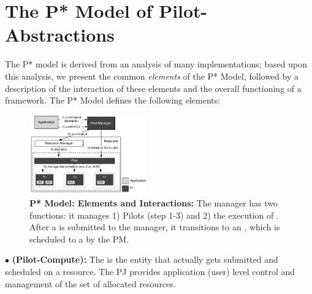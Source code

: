 \documentclass{sig-alternate}
\begin{document}
\section{The P* Model of Pilot-\\Abstractions}
\label{sec:pilot-model}

The P* model is derived from an analysis of many \pilotjob implementations;
based upon this analysis, we present the common {\it elements} of the P*
Model, followed by a description of the interaction of these elements and the
overall functioning of a \pilotjob framework. The P* Model defines the
following elements:

\begin{figure}[t]
	\upp\upp
    \centering
    \includegraphics[width=0.45\textwidth]{figures/pstar_model_single.pdf}
    \caption{ \textbf{P* Model: Elements and
        Interactions:} The manager has two functions: it manages 1)
      Pilots (step 1-3) and 2) the execution of \cus. After a \cu is
      submitted to the manager, it transitions to an \su, which is
      scheduled to a \pilot by the PM.}
	\upp\upp
    \label{fig:figures_pstar}
\end{figure}





\noindent$\bullet$ \textbf{\pilot (Pilot-Compute):} The \pilot is the
  entity that actually gets submitted and scheduled on a resource.
  The PJ provides application (user)
  level control and management of the set of allocated resources.


\end{document}
